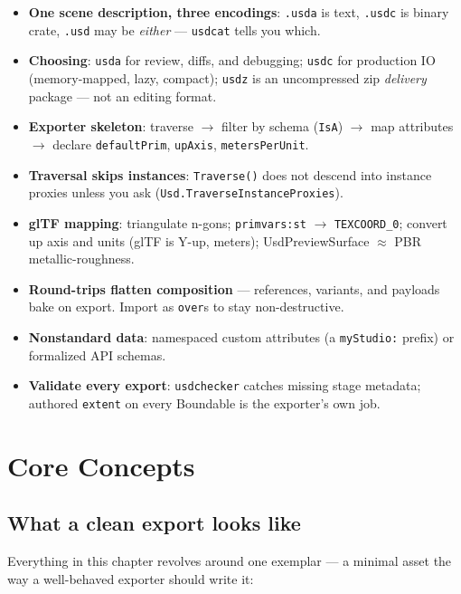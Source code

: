 \CheatSheetTitle
\begin{itemize}[leftmargin=*]
  \item \textbf{One scene description, three encodings}: \texttt{.usda} is
        text, \texttt{.usdc} is binary crate, \texttt{.usd} may be
        \emph{either} --- \texttt{usdcat} tells you which.
  \item \textbf{Choosing}: \texttt{usda} for review, diffs, and debugging;
        \texttt{usdc} for production IO (memory-mapped, lazy, compact);
        \texttt{usdz} is an uncompressed zip \emph{delivery} package --- not an
        editing format.
  \item \textbf{Exporter skeleton}: traverse $\rightarrow$ filter by schema
        (\texttt{IsA}) $\rightarrow$ map attributes $\rightarrow$ declare
        \texttt{defaultPrim}, \texttt{upAxis}, \texttt{metersPerUnit}.
  \item \textbf{Traversal skips instances}: \texttt{Traverse()} does not
        descend into instance proxies unless you ask
        (\texttt{Usd.TraverseInstanceProxies}).
  \item \textbf{glTF mapping}: triangulate n-gons; \texttt{primvars:st}
        $\rightarrow$ \texttt{TEXCOORD\_0}; convert up axis and units (glTF is
        Y-up, meters); UsdPreviewSurface $\approx$ PBR metallic-roughness.
  \item \textbf{Round-trips flatten composition} --- references, variants, and
        payloads bake on export. Import as \texttt{over}s to stay
        non-destructive.
  \item \textbf{Nonstandard data}: namespaced custom attributes (a
        \texttt{myStudio:} prefix) or formalized API
        schemas.
  \item \textbf{Validate every export}: \texttt{usdchecker} catches missing
        stage metadata; authored \texttt{extent} on every Boundable is the
        exporter's own job.
\end{itemize}

\section{Core Concepts}

\subsection{What a clean export looks like}\label{sec:de-clean}
Everything in this chapter revolves around one exemplar --- a minimal asset
the way a well-behaved exporter should write it:

